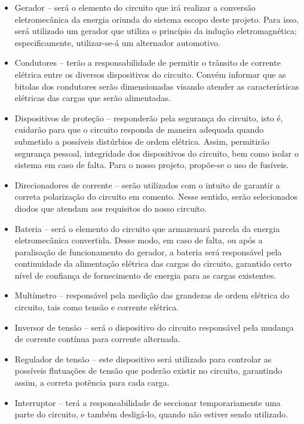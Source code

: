 \begin{itemize}
\item Gerador – será o elemento do circuito que irá realizar a conversão eletromecânica da energia oriunda do sistema escopo deste projeto. Para isso, será 
  utilizado um gerador que utiliza o princípio da indução eletromagnética; especificamente, utilizar-se-á um alternador automotivo.
\item Condutores – terão a responsabilidade de permitir o trânsito de corrente elétrica entre os diversos dispositivos do circuito. Convém informar que as 
  bitolas dos condutores serão dimensionadas visando atender as características elétricas das cargas que serão alimentadas.
\item Dispositivos de proteção – responderão pela segurança do circuito, isto é, cuidarão para que o circuito responda de maneira adequada quando submetido a 
  possíveis distúrbios de ordem elétrica. Assim, permitirão segurança pessoal, integridade dos dispositivos do circuito, bem como isolar o sistema em caso de 
  falta. Para o nosso projeto, propõe-se o uso de fusíveis.
\item Direcionadores de corrente – serão utilizados com o intuito de garantir a correta polarização do circuito em comento. Nesse sentido, serão selecionados 
  diodos que atendam aos requisitos do nosso circuito.
\item Bateria – será o elemento do circuito que armazenará parcela da energia eletromecânica convertida. Desse modo, em caso de falta, ou após a paralisação 
  de funcionamento do gerador, a bateria será responsável pela continuidade da alimentação elétrica das cargas do circuito, garantido certo nível de confiança 
  de fornecimento de energia para as cargas existentes.
\item Multímetro – responsável pela medição das grandezas de ordem elétrica do circuito, tais como tensão e corrente elétrica.
\item Inversor de tensão – será o dispositivo do circuito responsável pela mudança de corrente contínua para corrente alternada.
\item Regulador de tensão – este dispositivo será utilizado para controlar as possíveis flutuações de tensão que poderão existir no circuito, garantindo assim, 
  a correta potência para cada carga.
\item Interruptor – terá a responsabilidade de seccionar temporariamente uma parte do circuito, e também desligá-lo, quando não estiver sendo utilizado. 
\end{itemize}


